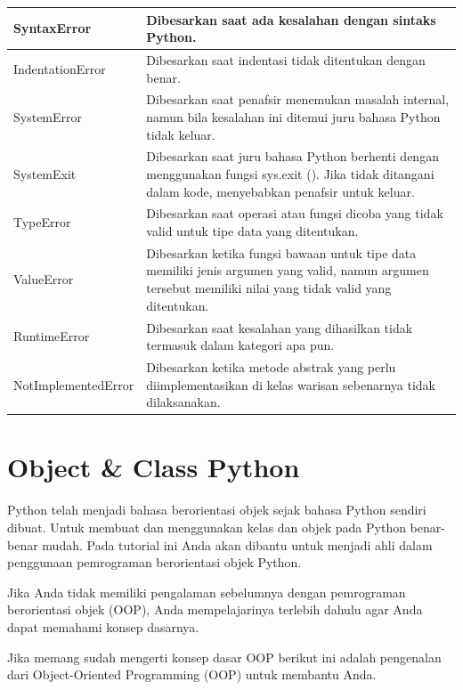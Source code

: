 \begin{center}
\begin{tabular}{ | m{3cm} | m{7cm} | }
\hline
SyntaxError & Dibesarkan saat ada kesalahan dengan sintaks Python. \\
\hline
IndentationError & Dibesarkan saat indentasi tidak ditentukan dengan benar. \\
\hline
SystemError & Dibesarkan saat penafsir menemukan masalah internal, namun bila kesalahan ini ditemui juru bahasa Python tidak keluar. \\
\hline
SystemExit & Dibesarkan saat juru bahasa Python berhenti dengan menggunakan fungsi sys.exit (). Jika tidak ditangani dalam kode, menyebabkan penafsir untuk keluar. \\
\hline
TypeError & Dibesarkan saat operasi atau fungsi dicoba yang tidak valid untuk tipe data yang ditentukan. \\
\hline
ValueError & Dibesarkan ketika fungsi bawaan untuk tipe data memiliki jenis argumen yang valid, namun argumen tersebut memiliki nilai yang tidak valid yang ditentukan. \\
\hline
RuntimeError & Dibesarkan saat kesalahan yang dihasilkan tidak termasuk dalam kategori apa pun. \\
\hline
NotImplementedError & Dibesarkan ketika metode abstrak yang perlu diimplementasikan di kelas warisan sebenarnya tidak dilaksanakan. \\
\hline
\end{tabular}
\end{center}

\section{Object \& Class Python}
Python telah menjadi bahasa berorientasi objek sejak bahasa Python sendiri dibuat. Untuk membuat dan menggunakan kelas dan objek pada Python benar-benar mudah. Pada tutorial ini Anda akan dibantu untuk menjadi ahli dalam penggunaan pemrograman berorientasi objek Python.

Jika Anda tidak memiliki pengalaman sebelumnya dengan pemrograman berorientasi objek (OOP), Anda mempelajarinya terlebih dahulu agar Anda dapat memahami konsep dasarnya.

Jika memang sudah mengerti konsep dasar OOP berikut ini adalah pengenalan dari Object-Oriented Programming (OOP) untuk membantu Anda.

